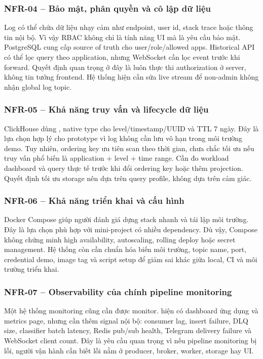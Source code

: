 \subsubsection{NFR-04 -- Bảo mật, phân quyền và cô lập dữ liệu}

Log có thể chứa dữ liệu nhạy cảm như endpoint, user id, stack trace hoặc thông tin nội bộ. Vì vậy RBAC không chỉ là tính năng UI mà là yêu cầu bảo mật. PostgreSQL cung cấp source of truth cho user/role/allowed apps. Historical API có thể lọc query theo application, nhưng WebSocket cần lọc event trước khi forward. Quyết định quan trọng ở đây là luôn thực thi authorization ở server, không tin tưởng frontend. Hệ thống hiện cần sửa live stream để non-admin không nhận global log topic.

\subsubsection{NFR-05 -- Khả năng truy vấn và lifecycle dữ liệu}

ClickHouse dùng , native type cho level/timestamp/UUID và TTL 7 ngày. Đây là lựa chọn hợp lý cho prototype vì log không cần lưu vô hạn trong môi trường demo. Tuy nhiên, ordering key  ưu tiên scan theo thời gian, chưa chắc tối ưu nếu truy vấn phổ biến là application + level + time range. Cần đo workload dashboard và query thực tế trước khi đổi ordering key hoặc thêm projection. Quyết định tối ưu storage nên dựa trên query profile, không dựa trên cảm giác.

\subsubsection{NFR-06 -- Khả năng triển khai và cấu hình}

Docker Compose giúp người đánh giá dựng stack nhanh và tái lập môi trường. Đây là lựa chọn phù hợp với mini-project có nhiều dependency. Dù vậy, Compose không chứng minh high availability, autoscaling, rolling deploy hoặc secret management. Hệ thống còn cần chuẩn hóa biến môi trường, topic name, port, credential demo, image tag và script setup để giảm sai khác giữa local, CI và môi trường triển khai.

\subsubsection{NFR-07 -- Observability của chính pipeline monitoring}

Một hệ thống monitoring cũng cần được monitor. \LogRider{} hiện có dashboard ứng dụng và metrics page, nhưng cần thêm signal nội bộ: consumer lag, insert failure, DLQ size, classifier batch latency, Redis pub/sub health, Telegram delivery failure và WebSocket client count. Đây là yêu cầu quan trọng vì nếu pipeline monitoring bị lỗi, người vận hành cần biết lỗi nằm ở producer, broker, worker, storage hay UI.

